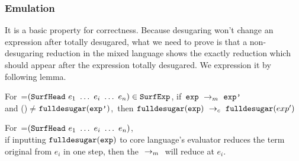 \subsubsection{Emulation} It is a basic property for correctness. Because desugaring won't change an expression after totally desugared, what we need to prove is that a non-desugaring reduction in the mixed language shows the exactly reduction which should appear after the expression totally desugared. We expression it by following lemma.

\begin{lemma}[Emulation]

For~=$(\mbox{\tt SurfHead}~e_1~\ldots~e_i~\ldots~e_n)\in\mbox{\tt SurfExp}$, if~$\mbox{\tt exp} ~\rightarrow_m~\mbox{\tt exp'}$\\ and ()$\not=$$\mbox{\tt fulldesugar}(\mbox{\tt exp'})$,~then $\mbox{\tt fulldesugar}(\mbox{\tt exp}) ~\rightarrow_c~\mbox{\tt fulldesugar}(exp')$
\end{lemma}

\begin{lemma}

For~=$(\mbox{\tt SurfHead}~e_1~\ldots~e_i~\ldots~e_n)$,\\ if inputting $\mbox{\tt fulldesugar}(\mbox{\tt exp})$ to core language's evaluator reduces the term original from $e_i$ in one step, then the $~\rightarrow_m~$ will reduce  at $e_i$.

\end{lemma}

